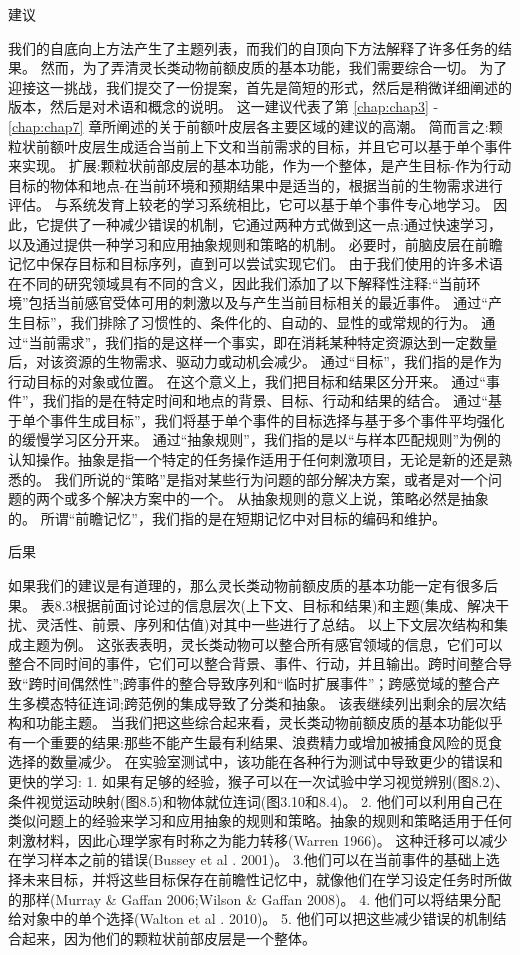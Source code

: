 建议

我们的自底向上方法产生了主题列表，而我们的自顶向下方法解释了许多任务的结果。
然而，为了弄清灵长类动物前额皮质的基本功能，我们需要综合一切。
为了迎接这一挑战，我们提交了一份提案，首先是简短的形式，然后是稍微详细阐述的版本，然后是对术语和概念的说明。
这一建议代表了第 \ref{chap:chap3} - \ref{chap:chap7} 章所阐述的关于前额叶皮层各主要区域的建议的高潮。
简而言之:颗粒状前额叶皮层生成适合当前上下文和当前需求的目标，并且它可以基于单个事件来实现。
扩展:颗粒状前部皮层的基本功能，作为一个整体，是产生目标-作为行动目标的物体和地点-在当前环境和预期结果中是适当的，根据当前的生物需求进行评估。
与系统发育上较老的学习系统相比，它可以基于单个事件专心地学习。
因此，它提供了一种减少错误的机制，它通过两种方式做到这一点:通过快速学习，以及通过提供一种学习和应用抽象规则和策略的机制。
必要时，前脑皮层在前瞻记忆中保存目标和目标序列，直到可以尝试实现它们。
由于我们使用的许多术语在不同的研究领域具有不同的含义，因此我们添加了以下解释性注释:“当前环境”包括当前感官受体可用的刺激以及与产生当前目标相关的最近事件。
通过“产生目标”，我们排除了习惯性的、条件化的、自动的、显性的或常规的行为。
通过“当前需求”，我们指的是这样一个事实，即在消耗某种特定资源达到一定数量后，对该资源的生物需求、驱动力或动机会减少。
通过“目标”，我们指的是作为行动目标的对象或位置。
在这个意义上，我们把目标和结果区分开来。
通过“事件”，我们指的是在特定时间和地点的背景、目标、行动和结果的结合。
通过“基于单个事件生成目标”，我们将基于单个事件的目标选择与基于多个事件平均强化的缓慢学习区分开来。
通过“抽象规则”，我们指的是以“与样本匹配规则”为例的认知操作。抽象是指一个特定的任务操作适用于任何刺激项目，无论是新的还是熟悉的。
我们所说的“策略”是指对某些行为问题的部分解决方案，或者是对一个问题的两个或多个解决方案中的一个。
从抽象规则的意义上说，策略必然是抽象的。
所谓“前瞻记忆”，我们指的是在短期记忆中对目标的编码和维护。



后果

如果我们的建议是有道理的，那么灵长类动物前额皮质的基本功能一定有很多后果。
表8.3根据前面讨论过的信息层次(上下文、目标和结果)和主题(集成、解决干扰、灵活性、前景、序列和估值)对其中一些进行了总结。
以上下文层次结构和集成主题为例。
这张表表明，灵长类动物可以整合所有感官领域的信息，它们可以整合不同时间的事件，它们可以整合背景、事件、行动，并且输出。跨时间整合导致“跨时间偶然性”;跨事件的整合导致序列和“临时扩展事件”；跨感觉域的整合产生多模态特征连词;跨范例的集成导致了分类和抽象。
该表继续列出剩余的层次结构和功能主题。
当我们把这些综合起来看，灵长类动物前额皮质的基本功能似乎有一个重要的结果:那些不能产生最有利结果、浪费精力或增加被捕食风险的觅食选择的数量减少。
在实验室测试中，该功能在各种行为测试中导致更少的错误和更快的学习:
1. 如果有足够的经验，猴子可以在一次试验中学习视觉辨别(图8.2)、条件视觉运动映射(图8.5)和物体就位连词(图3.10和8.4)。
2. 他们可以利用自己在类似问题上的经验来学习和应用抽象的规则和策略。抽象的规则和策略适用于任何刺激材料，因此心理学家有时称之为能力转移(Warren 1966)。
这种迁移可以减少在学习样本之前的错误(Bussey et al . 2001)。
3.他们可以在当前事件的基础上选择未来目标，并将这些目标保存在前瞻性记忆中，就像他们在学习设定任务时所做的那样(Murray \& Gaffan 2006;Wilson \& Gaffan 2008)。
4. 他们可以将结果分配给对象中的单个选择(Walton et al . 2010)。
5. 他们可以把这些减少错误的机制结合起来，因为他们的颗粒状前部皮层是一个整体。



